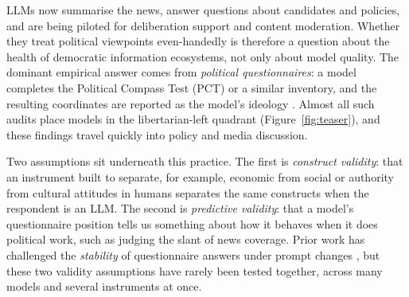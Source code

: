 \documentclass[11pt]{article}
\begin{document}
LLMs now summarise the news, answer questions about candidates and policies, and are being piloted for deliberation support and content moderation. Whether they treat political viewpoints even-handedly is therefore a question about the health of democratic information ecosystems, not only about model quality. The dominant empirical answer comes from \emph{political questionnaires}: a model completes the Political Compass Test (PCT) or a similar inventory, and the resulting coordinates are reported as the model's ideology \citep{hartmann2023political,motoki2024more,10.1371/journal.pone.0306621}. Almost all such audits place models in the libertarian-left quadrant (Figure~\ref{fig:teaser}), and these findings travel quickly into policy and media discussion.

Two assumptions sit underneath this practice. The first is \emph{construct validity}: that an instrument built to separate, for example, economic from social or authority from cultural attitudes in humans separates the same constructs when the respondent is an LLM. The second is \emph{predictive validity}: that a model's questionnaire position tells us something about how it behaves when it does political work, such as judging the slant of news coverage. Prior work has challenged the \emph{stability} of questionnaire answers under prompt changes \citep{rottger-etal-2024-political,ceron-etal-2024-beyond,dominguez2024questioning}, but these two validity assumptions have rarely been tested together, across many models and several instruments at once.
\end{document}
